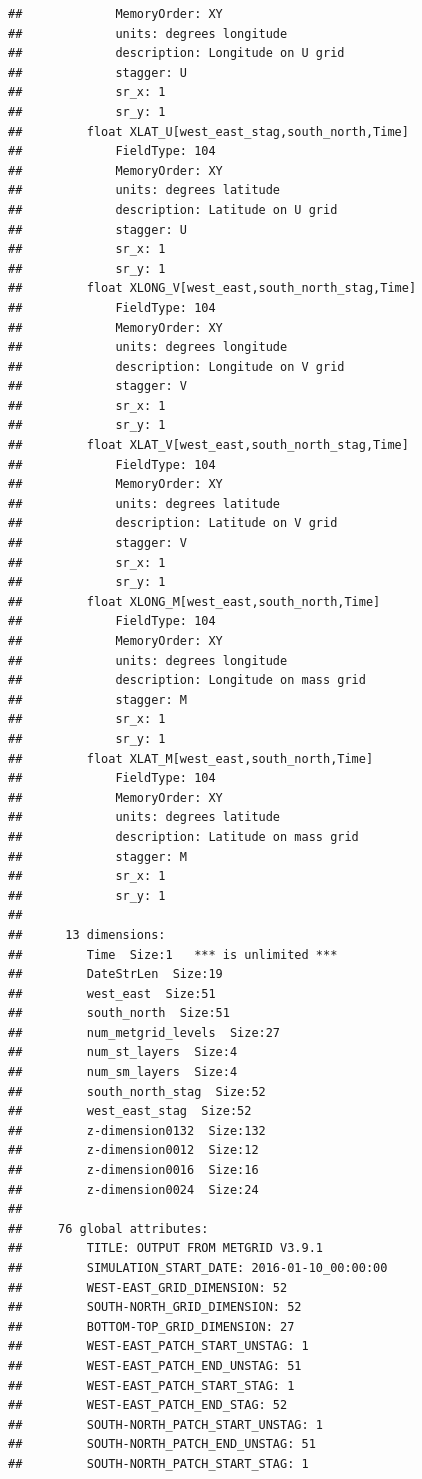 \documentclass[]{book}
\begin{document}
\begin{verbatim}
##             MemoryOrder: XY 
##             units: degrees longitude
##             description: Longitude on U grid
##             stagger: U
##             sr_x: 1
##             sr_y: 1
##         float XLAT_U[west_east_stag,south_north,Time]   
##             FieldType: 104
##             MemoryOrder: XY 
##             units: degrees latitude
##             description: Latitude on U grid
##             stagger: U
##             sr_x: 1
##             sr_y: 1
##         float XLONG_V[west_east,south_north_stag,Time]   
##             FieldType: 104
##             MemoryOrder: XY 
##             units: degrees longitude
##             description: Longitude on V grid
##             stagger: V
##             sr_x: 1
##             sr_y: 1
##         float XLAT_V[west_east,south_north_stag,Time]   
##             FieldType: 104
##             MemoryOrder: XY 
##             units: degrees latitude
##             description: Latitude on V grid
##             stagger: V
##             sr_x: 1
##             sr_y: 1
##         float XLONG_M[west_east,south_north,Time]   
##             FieldType: 104
##             MemoryOrder: XY 
##             units: degrees longitude
##             description: Longitude on mass grid
##             stagger: M
##             sr_x: 1
##             sr_y: 1
##         float XLAT_M[west_east,south_north,Time]   
##             FieldType: 104
##             MemoryOrder: XY 
##             units: degrees latitude
##             description: Latitude on mass grid
##             stagger: M
##             sr_x: 1
##             sr_y: 1
## 
##      13 dimensions:
##         Time  Size:1   *** is unlimited ***
##         DateStrLen  Size:19
##         west_east  Size:51
##         south_north  Size:51
##         num_metgrid_levels  Size:27
##         num_st_layers  Size:4
##         num_sm_layers  Size:4
##         south_north_stag  Size:52
##         west_east_stag  Size:52
##         z-dimension0132  Size:132
##         z-dimension0012  Size:12
##         z-dimension0016  Size:16
##         z-dimension0024  Size:24
## 
##     76 global attributes:
##         TITLE: OUTPUT FROM METGRID V3.9.1
##         SIMULATION_START_DATE: 2016-01-10_00:00:00
##         WEST-EAST_GRID_DIMENSION: 52
##         SOUTH-NORTH_GRID_DIMENSION: 52
##         BOTTOM-TOP_GRID_DIMENSION: 27
##         WEST-EAST_PATCH_START_UNSTAG: 1
##         WEST-EAST_PATCH_END_UNSTAG: 51
##         WEST-EAST_PATCH_START_STAG: 1
##         WEST-EAST_PATCH_END_STAG: 52
##         SOUTH-NORTH_PATCH_START_UNSTAG: 1
##         SOUTH-NORTH_PATCH_END_UNSTAG: 51
##         SOUTH-NORTH_PATCH_START_STAG: 1

\end{verbatim}
\end{document}
